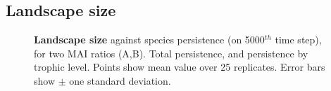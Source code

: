 \clearpage
\subsection{Landscape size}
\label{sec:lsvp}

% 

\begin{figure}
	\centering	
	\setlength{\subfloatlabelskip}{0pt}
	\caption{\textbf{Landscape size} against species persistence (on 5000$^{th}$ time step), for two MAI ratios (A,B). Total persistence, and persistence by trophic level. Points show mean value over 25 replicates. Error bars show $\pm$ one standard deviation.}
	\label{fig:ls_v_comp}
\end{figure}

